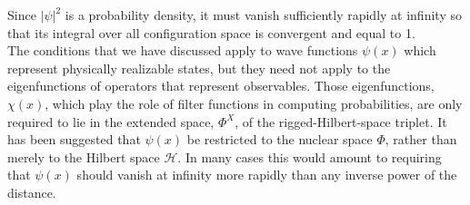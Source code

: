 Since $|\psi|^2$ is a probability density, it must vanish sufficiently rapidly at infinity so that its integral over all configuration space is convergent and equal to 1. \\
The conditions that we have discussed apply to wave functions $\psi(x)$ which represent physically realizable states, but they need not apply to the eigenfunctions of operators that represent observables. Those eigenfunctions, $\chi(x)$, which play the role of filter functions in computing probabilities, are only required to lie in the extended space, $\Phi^X$, of the rigged-Hilbert-space triplet. It has been suggested that $\psi(x)$ be restricted to the nuclear space $\Phi$, rather than merely to the Hilbert space $\mathcal{H}$. In many cases this would amount to requiring that $\psi(x)$ should vanish at infinity more rapidly than any inverse power of the distance. 

